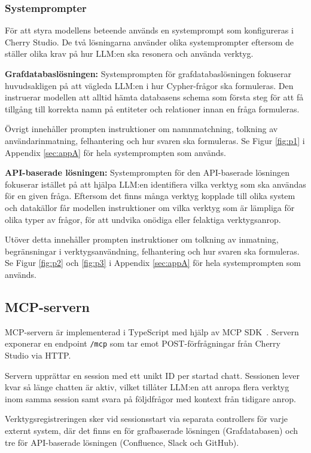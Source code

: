 \subsubsection{Systemprompter}
För att styra modellens beteende används en systemprompt som konfigureras i Cherry Studio.
De två lösningarna använder olika systemprompter eftersom de ställer olika krav på hur LLM:en ska resonera och använda verktyg.

\textbf{Grafdatabaslösningen:}
Systemprompten för grafdatabaslösningen fokuserar huvudsakligen på att vägleda LLM:en i hur Cypher-frågor ska formuleras.
Den instruerar modellen att alltid hämta databasens schema som första steg för att få tillgång till korrekta namn på entiteter och relationer innan en fråga formuleras.

Övrigt innehåller prompten instruktioner om namnmatchning, tolkning av användarinmatning, felhantering och hur svaren ska formuleras.
Se Figur \ref{fig:p1} i Appendix \ref{sec:appA} för hela systemprompten som används.

\textbf{API-baserade lösningen:}
Systemprompten för den API-baserade lösningen fokuserar istället på att hjälpa LLM:en identifiera vilka verktyg som ska användas för en given fråga.
Eftersom det finns många verktyg kopplade till olika system och datakällor får modellen instruktioner om vilka verktyg som är lämpliga för olika typer av frågor, för att undvika onödiga eller felaktiga verktygsanrop.

Utöver detta innehåller prompten instruktioner om tolkning av inmatning, begränsningar i verktygsanvändning, felhantering och hur svaren ska formuleras.
Se Figur \ref{fig:p2} och \ref{fig:p3} i Appendix \ref{sec:appA} för hela systemprompten som används.

\subsection{MCP-servern}\label{subsec:overview2}

 MCP-servern är implementerad i TypeScript med hjälp av MCP SDK~\cite{15}.
  Servern exponerar en endpoint \texttt{/mcp} som tar emot POST-förfrågningar
  från Cherry Studio via HTTP.

Servern upprättar en session med ett unikt ID per startad chatt. Sessionen lever kvar så länge chatten är aktiv, vilket tillåter LLM:en att anropa flera verktyg inom samma session samt svara på följdfrågor med kontext från tidigare anrop.

Verktygsregistreringen sker vid sessionsstart via separata controllers för varje externt system, där det finns en för grafbaserade lösningen (Grafdatabasen) och tre för API-baserade lösningen (Confluence, Slack och GitHub).

